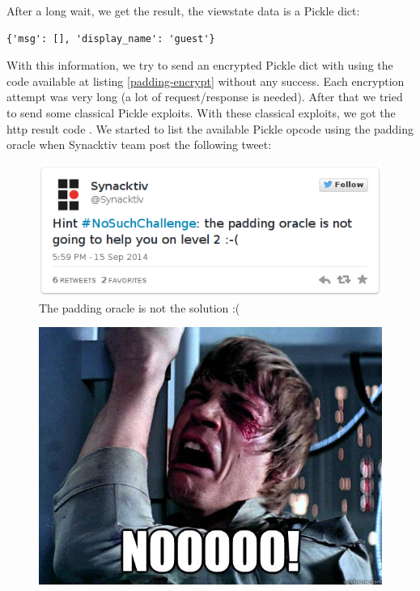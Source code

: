 \documentclass[a4paper]{article}
\begin{document}
After a long wait, we get the result, the viewstate data is a Pickle dict:

\begin{lstlisting}[caption={},numbers=none]
{'msg': [], 'display_name': 'guest'}
\end{lstlisting}

With this information, we try to send an encrypted Pickle dict with  using the code available at listing \ref{padding-encrypt} without any success. Each encryption attempt was very long (a lot of request/response is needed).
After that we tried to send some classical Pickle exploits. With these classical exploits, we got the http result code . We started to list the available Pickle opcode using the padding oracle when Synacktiv team post the following tweet:

\begin{figure}[H]
    \center
    \includegraphics[scale=0.6]{tweet_padding_oracle}
    \caption{The padding oracle is not the solution :(}
\end{figure}

\begin{figure}[H]
    \center
    \includegraphics[scale=0.3]{no-meme}
\end{figure}
\end{document}
